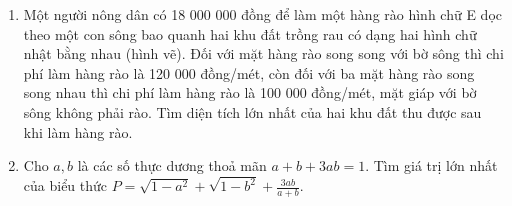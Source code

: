 \begin{ex}
{\begin{center}
		
		\end{center}
		}
\end{ex}

\begin{ex} %
	\begin{enumerate}
		\item[a)] Một người nông dân có 18 000 000 đồng để làm một hàng rào hình chữ E dọc theo một con sông bao quanh hai khu đất trồng rau có dạng hai hình chữ nhật bằng nhau (hình vẽ). Đối với mặt hàng rào song song với bờ sông thì chi phí làm hàng rào là 120 000 đồng/mét, còn đối với ba mặt hàng rào song song nhau thì chi phí làm hàng rào là 100 000 đồng/mét, mặt giáp với bờ sông không phải rào. Tìm diện tích lớn nhất của hai khu đất thu được sau khi làm hàng rào.
		\item[b)] Cho $a, b$ là các số thực dương thoả mãn $a+b+3ab = 1$.
		Tìm giá trị lớn nhất của biểu thức $P = \sqrt{1-a^2} + \sqrt{1-b^2} + \frac{3ab}{a+b}$.
	\end{enumerate}
\end{ex}



